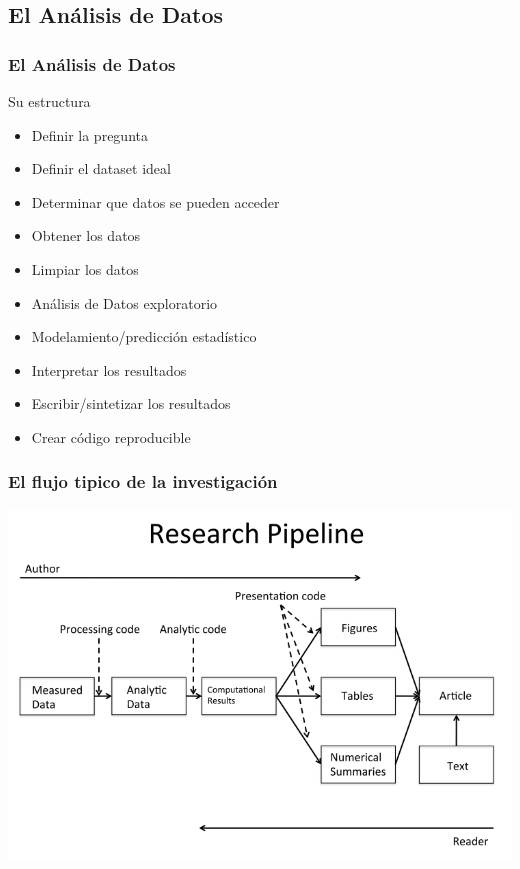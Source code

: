 \documentclass[sans serif,9pt,xcolor=dvipsnames]{beamer}%
\begin{document}
\subsection{El Análisis de Datos}
\begin{frame}
\frametitle{El Análisis de Datos }
\justifying
\begin{block}{Su estructura}
\begin{itemize}
\item Definir la pregunta
\item Definir el dataset ideal
\item Determinar que datos se pueden acceder
\item Obtener los datos
\item Limpiar los datos
\item Análisis de Datos exploratorio
\item Modelamiento/predicción estadístico
\item Interpretar los resultados
\item Escribir/sintetizar los resultados
\item Crear código reproducible
\end{itemize}
\end{block}
\end{frame}

\begin{frame}
\frametitle{El flujo tipico de la investigación }
\justifying
\begin{block}{}
\includegraphics {imagenes/research_flow.png}  
\end{block}
\end{frame}
\end{document}
